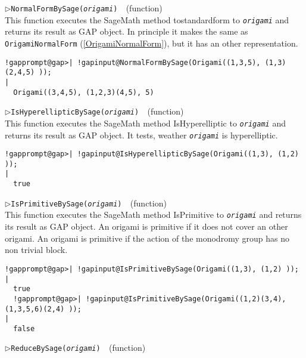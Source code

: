 \documentclass[a4paper,11pt]{report}
\begin{document}
{{{\begin{Verbatim}[commandchars=!@|,fontsize=\small,frame=single,label=Example]
\end{Verbatim}
 \noindent\textcolor{FuncColor}{$\triangleright$\enspace\texttt{NormalFormBySage({\mdseries\slshape origami})
\label{NormalFormBySage}
}\hfill{\scriptsize (function)}}\\


 This function executes the SageMath method
to{\textunderscore}standard{\textunderscore}form to \mbox{\texttt{\mdseries\slshape origami}} and returns its result as \textsf{GAP} object. In principle it makes the same as \texttt{OrigamiNormalForm} (\ref{OrigamiNormalForm}), but it has an other representation. 
\begin{Verbatim}[commandchars=!@|,fontsize=\small,frame=single,label=Example]
  !gapprompt@gap>| !gapinput@NormalFormBySage(Origami((1,3,5), (1,3)(2,4,5) ));
|
  Origami((3,4,5), (1,2,3)(4,5), 5)
\end{Verbatim}
 \noindent\textcolor{FuncColor}{$\triangleright$\enspace\texttt{IsHyperellipticBySage({\mdseries\slshape origami})
\label{IsHyperellipticBySage}
}\hfill{\scriptsize (function)}}\\


 This function executes the SageMath method IsHyperelliptic to \mbox{\texttt{\mdseries\slshape origami}} and returns its result as \textsf{GAP} object. It tests, weather \mbox{\texttt{\mdseries\slshape origami}} is hyperelliptic. 
\begin{Verbatim}[commandchars=!@|,fontsize=\small,frame=single,label=Example]
  !gapprompt@gap>| !gapinput@IsHyperellipticBySage(Origami((1,3), (1,2) ));                                                                                           
|
  true
\end{Verbatim}
 \noindent\textcolor{FuncColor}{$\triangleright$\enspace\texttt{IsPrimitiveBySage({\mdseries\slshape origami})
\label{IsPrimitiveBySage}
}\hfill{\scriptsize (function)}}\\


 This function executes the SageMath method IsPrimitive to \mbox{\texttt{\mdseries\slshape origami}} and returns its result as \textsf{GAP} object. An origami is primitive if it does not cover an other origami. An
origami is primitive if the action of the monodromy group has no non trivial
block. 
\begin{Verbatim}[commandchars=!@|,fontsize=\small,frame=single,label=Example]
  !gapprompt@gap>| !gapinput@IsPrimitiveBySage(Origami((1,3), (1,2) ));
|
  true
  !gapprompt@gap>| !gapinput@IsPrimitiveBySage(Origami((1,2)(3,4), (1,3,5,6)(2,4) ));
|
  false
\end{Verbatim}
 \noindent\textcolor{FuncColor}{$\triangleright$\enspace\texttt{ReduceBySage({\mdseries\slshape origami})
\label{ReduceBySage}
}\hfill{\scriptsize (function)}}\\


}}}
\end{document}
